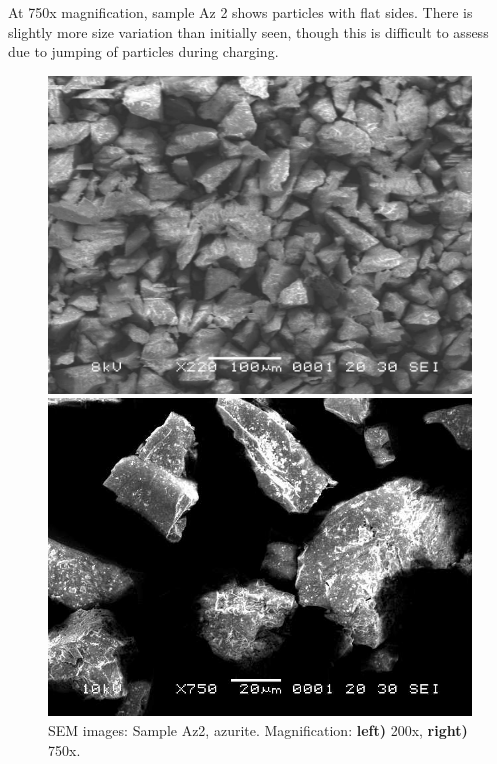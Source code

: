 At 750x magnification, sample Az 2 shows particles with flat sides. There is slightly more size variation than initially seen, though this is difficult to assess due to jumping of particles during charging.

\begin{figure}[H]
\centering
\begin{minipage}{.45\textwidth}
  \centering
  \includegraphics[width=\linewidth]{Az2_x200_2_240221}
\end{minipage}
\begin{minipage}{.45\textwidth}
  \centering
  \includegraphics[width=\linewidth]{Az2_x750_1_150321}
\end{minipage}
\caption[SEM images: Sample Az2, azurite]{SEM images: Sample Az2, azurite. Magnification: \textbf{left)} 200x, \textbf{right)} 750x.}
\label{fig:az2_sem_2}
\end{figure}


